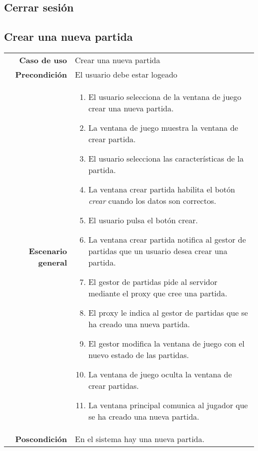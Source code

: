 \subsection{Cerrar sesión}

\subsection{Crear una nueva partida}
{\footnotesize
\begin{tabularx}{0.95\textwidth}{r|X}

\textbf{Caso de uso} & Crear una nueva partida \\

\textbf{Precondición} & El usuario debe estar logeado \\

\textbf{Escenario general} & \begin{enumerate}
\item El usuario selecciona de la ventana de juego crear una nueva partida.
\item La ventana de juego muestra la ventana de crear partida.
\item El usuario selecciona las características de la partida.
\item La ventana crear partida habilita el botón \emph{crear} cuando los datos son correctos.
\item El usuario pulsa el botón crear.
\item La ventana crear partida notifica al gestor de partidas que un usuario desea crear una partida. 
\item El gestor de partidas pide al servidor mediante el proxy que cree una partida.
\item El proxy le indica al gestor de partidas que se ha creado una nueva partida.
\item El gestor modifica la ventana de juego con el nuevo estado de las partidas.  
\item La ventana de juego oculta la ventana de crear partidas.
\item La ventana principal comunica al jugador que se ha creado una nueva partida.
\end{enumerate} \\

\textbf{Poscondición} & En el sistema hay una nueva partida.

\end{tabularx}
}


